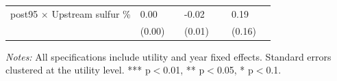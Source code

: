 \begin{table}[htbp]
{\begin{tabular}{p{5.5cm}>{\raggedleft\arraybackslash}p{3cm}>{\raggedleft\arraybackslash}p{3cm}>{\raggedleft\arraybackslash}p{3cm}}
post95 $\times$ Upstream sulfur \% & \phantom{(}\phantom{-}0.00$^{\phantom{*}\phantom{*}\phantom{*}}$ & \phantom{(}-0.02$^{\phantom{*}\phantom{*}\phantom{*}}$ & \phantom{(}\phantom{-}0.19$^{\phantom{*}\phantom{*}\phantom{*}}$ \\
 & (\phantom{-}0.00)\phantom{$^{***}$} & (\phantom{-}0.01)\phantom{$^{***}$} & (\phantom{-}0.16)\phantom{$^{***}$} \\
\bottomrule
\end{tabular}
}
\begin{minipage}{15.6247cm}
\vspace{4pt}
\footnotesize
\raggedright
\textit{Notes:} All specifications include utility and year fixed effects. Standard errors clustered at the utility level. *** p$<$0.01, ** p$<$0.05, * p$<$0.1.
\end{minipage}
\end{table}
